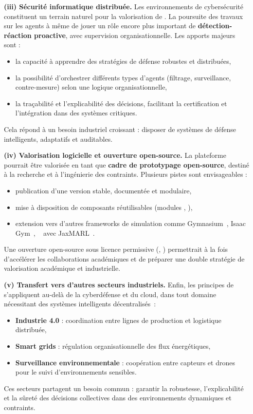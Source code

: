 \medskip
\noindent
\textbf{(iii) Sécurité informatique distribuée.}
Les environnements de cybersécurité constituent un terrain naturel pour la valorisation de .
La poursuite des travaux sur les agents  à même de jouer un rôle encore plus important de \textbf{détection-réaction proactive}, avec supervision organisationnelle.
Les apports majeurs sont :
\begin{itemize}
  \item la capacité à apprendre des stratégies de défense robustes et distribuées,
  \item la possibilité d’orchestrer différents types d’agents (filtrage, surveillance, contre-mesure) selon une logique organisationnelle,
  \item la traçabilité et l’explicabilité des décisions, facilitant la certification et l’intégration dans des systèmes critiques.
\end{itemize}
Cela répond à un besoin industriel croissant : disposer de systèmes de défense intelligents, adaptatifs et auditables.

\medskip
\noindent
\textbf{(iv) Valorisation logicielle et ouverture open-source.}
La plateforme  pourrait être valorisée en tant que \textbf{cadre de prototypage open-source}, destiné à la recherche et à l’ingénierie des  contraints.
Plusieurs pistes sont envisageables :
\begin{itemize}
  \item publication d’une version stable, documentée et modulaire,
  \item mise à disposition de composants réutilisables (modules , ),
  \item extension vers d’autres frameworks de simulation comme Gymnasium~\cite{kwiatkowski2024}, Isaac Gym~\cite{Makoviychuk2021}, ~\cite{Frostig2019} avec JaxMARL~\cite{Rutherford2024}.
\end{itemize}
Une ouverture open-source sous licence permissive (, ) permettrait à la fois d’accélérer les collaborations académiques et de préparer une double stratégie de valorisation académique et industrielle.

\medskip
\noindent
\textbf{(v) Transfert vers d’autres secteurs industriels.}
Enfin, les principes de  s’appliquent au-delà de la cyberdéfense et du cloud, dans tout domaine nécessitant des systèmes intelligents décentralisés~:
\begin{itemize}
  \item \textbf{Industrie 4.0} : coordination entre lignes de production et logistique distribuée,
  \item \textbf{Smart grids} : régulation organisationnelle des flux énergétiques,
  \item \textbf{Surveillance environnementale} : coopération entre capteurs et drones pour le suivi d’environnements sensibles.
\end{itemize}
Ces secteurs partagent un besoin commun : garantir la robustesse, l’explicabilité et la sûreté des décisions collectives dans des environnements dynamiques et contraints.

